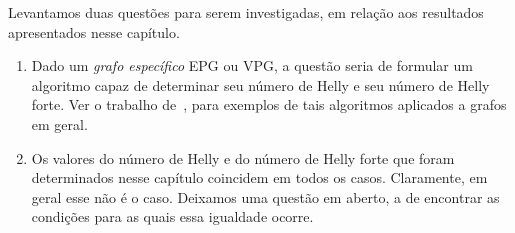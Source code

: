 \normalsize


Levantamos duas questões para serem investigadas, em relação aos resultados apresentados nesse capítulo.

\begin{enumerate}
\item Dado um {\it grafo específico}  EPG ou VPG, a  questão seria de formular um algoritmo capaz de determinar seu número de Helly e seu número de Helly forte. Ver o trabalho de~\cite{dourado2008improved}, para exemplos de tais algoritmos aplicados a grafos em geral.

\item Os valores do número de Helly e do número de Helly forte que foram determinados nesse capítulo coincidem em todos os casos. Claramente, em geral esse não é o caso. Deixamos uma questão em aberto, a de encontrar as condições para as quais essa igualdade ocorre.
\end{enumerate}










